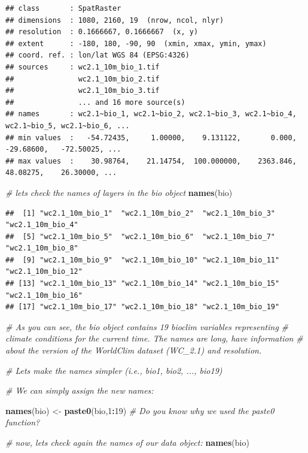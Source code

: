 \documentclass[
]{article}
\newenvironment{Shaded}{\begin{snugshade}}{\end{snugshade}}
\newcommand{\CommentTok}[1]{\textcolor[rgb]{0.56,0.35,0.01}{\textit{#1}}}
\newcommand{\DecValTok}[1]{\textcolor[rgb]{0.00,0.00,0.81}{#1}}
\newcommand{\FunctionTok}[1]{\textcolor[rgb]{0.13,0.29,0.53}{\textbf{#1}}}
\newcommand{\NormalTok}[1]{#1}
\newcommand{\OtherTok}[1]{\textcolor[rgb]{0.56,0.35,0.01}{#1}}
\newcommand{\SpecialCharTok}[1]{\textcolor[rgb]{0.81,0.36,0.00}{\textbf{#1}}}
\newcommand{\StringTok}[1]{\textcolor[rgb]{0.31,0.60,0.02}{#1}}
\begin{document}
\begin{verbatim}
## class       : SpatRaster 
## dimensions  : 1080, 2160, 19  (nrow, ncol, nlyr)
## resolution  : 0.1666667, 0.1666667  (x, y)
## extent      : -180, 180, -90, 90  (xmin, xmax, ymin, ymax)
## coord. ref. : lon/lat WGS 84 (EPSG:4326) 
## sources     : wc2.1_10m_bio_1.tif  
##               wc2.1_10m_bio_2.tif  
##               wc2.1_10m_bio_3.tif  
##               ... and 16 more source(s)
## names       : wc2.1~bio_1, wc2.1~bio_2, wc2.1~bio_3, wc2.1~bio_4, wc2.1~bio_5, wc2.1~bio_6, ... 
## min values  :   -54.72435,     1.00000,    9.131122,       0.000,   -29.68600,   -72.50025, ... 
## max values  :    30.98764,    21.14754,  100.000000,    2363.846,    48.08275,    26.30000, ...
\end{verbatim}

\begin{Shaded}
\begin{Highlighting}[]
\CommentTok{\# let\textquotesingle{}s check the names of layers in the bio object}
\FunctionTok{names}\NormalTok{(bio)}
\end{Highlighting}
\end{Shaded}

\begin{verbatim}
##  [1] "wc2.1_10m_bio_1"  "wc2.1_10m_bio_2"  "wc2.1_10m_bio_3"  "wc2.1_10m_bio_4" 
##  [5] "wc2.1_10m_bio_5"  "wc2.1_10m_bio_6"  "wc2.1_10m_bio_7"  "wc2.1_10m_bio_8" 
##  [9] "wc2.1_10m_bio_9"  "wc2.1_10m_bio_10" "wc2.1_10m_bio_11" "wc2.1_10m_bio_12"
## [13] "wc2.1_10m_bio_13" "wc2.1_10m_bio_14" "wc2.1_10m_bio_15" "wc2.1_10m_bio_16"
## [17] "wc2.1_10m_bio_17" "wc2.1_10m_bio_18" "wc2.1_10m_bio_19"
\end{verbatim}

\begin{Shaded}
\begin{Highlighting}[]
\CommentTok{\# As you can see, the bio object contains 19 bioclim variables representing }
\CommentTok{\# climate conditions for the current time. The names are long, have information}
\CommentTok{\# about the version of the WorldClim dataset (WC\_2.1) and resolution.}

\CommentTok{\# Let\textquotesingle{}s make the names simpler (i.e., bio1, bio2, ..., bio19)}

\CommentTok{\# We can simply assign the new names:}

\FunctionTok{names}\NormalTok{(bio) }\OtherTok{\textless{}{-}} \FunctionTok{paste0}\NormalTok{(}\StringTok{\textquotesingle{}bio\textquotesingle{}}\NormalTok{,}\DecValTok{1}\SpecialCharTok{:}\DecValTok{19}\NormalTok{) }\CommentTok{\# Do you know why we used the paste0 function?}

\CommentTok{\# now, let\textquotesingle{}s check again the names of our data object:}
\FunctionTok{names}\NormalTok{(bio)}
\end{Highlighting}
\end{Shaded}
\end{document}
